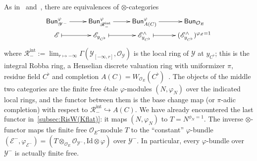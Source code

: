 \documentclass[11pt]{article}
\theoremstyle{definition}
\numberwithin{equation}{section}
\numberwithin{figure}{section}
\numberwithin{table}{section}
\newcommand{\Bun}{\mathsf{Bun}}
\begin{document}
As in~\cite[12.3.4]{ScWe15} and~\cite[8.5.3]{KeLi15}, there are equivalences of $\otimes$-categories
\[
\xymatrix@R=0pc{\Bun_{\mathscr{Y}^{-}}^{\varphi}\ar[r] & \Bun_{\mathscr{R}_{-}^{\mathrm{int}}}^{\varphi}\ar[r] & \Bun_{A(C)}^{\varphi}\ar[r] & \Bun_{\mathcal{O}_{E}}\\
\mathscr{E}\ar@{|->}[r] & \mathscr{E}_{y_{C^{\flat}}}\ar@{|->}[r] & \mathscr{E}_{y_{C^{\flat}}}^{\wedge}\ar@{|->}[r] & (\mathscr{E}_{y_{C^{\flat}}}^{\wedge})^{\varphi_{\mathscr{E}}=1} }
\]
where $\mathscr{R}_{-}^{\mathrm{int}}:=\lim_{r\mapsto-\infty}\Gamma(\mathscr{Y}_{[-\infty,r]},\mathscr{O}_{\mathscr{Y}})$ is the local ring of $\mathscr{Y}$ at $y_{C^{\flat}}$; this is the integral Robba ring, a Henselian discrete valuation ring with uniformizer $\pi$, residue field $C^{\flat}$ and completion $A(C)=W_{\mathcal{O}_{E}}(C^{\flat})$~\cite[1.8.2]{FaFo15}. The objects of the middle two categories are the finite free \'etale $\varphi$-modules $(N,\varphi_{N})$ over the indicated local rings, and the functor between them is the base change map (or $\pi$-adic completion) with respect to $\mathscr{R}_{-}^{\mathrm{int}}\hookrightarrow A(C)$. We have already encountered the last functor in~\ref{subsec:RisW(Kflat)}: it maps $(N,\varphi_{N})$ to $T=N^{\phi_{N}=1}$. The inverse $\otimes$-functor maps the finite free $\mathcal{O}_{E}$-module $T$ to the ``constant'' $\varphi$-bundle $(\mathscr{E}^{-},\varphi_{\mathscr{E}^{-}})=(T\otimes_{\mathcal{O}_{E}}\mathscr{O}_{\mathscr{Y}^{-}},\mathrm{Id}\otimes\varphi)$ over $\mathscr{Y}^{-}$. In particular, every $\varphi$-bundle over $\mathscr{Y}^{-}$ is actually finite free.

\subsubsection{}\label{subsec:FFDiagram}
\end{document}
